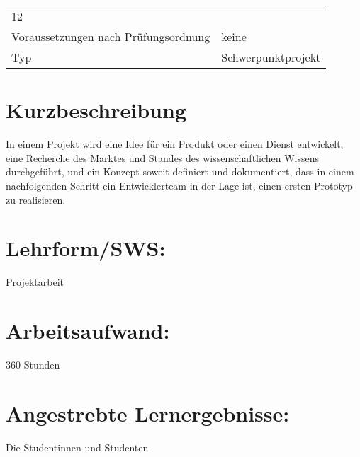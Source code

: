 \begin{longtable}[]{@{}ll@{}}
\begin{minipage}[t]{0.12\columnwidth}
12\strut
\end{minipage}\tabularnewline
\begin{minipage}[t]{0.12\columnwidth}\raggedright\strut
Voraussetzungen nach Prüfungsordnung\strut
\end{minipage} & \begin{minipage}[t]{0.12\columnwidth}\raggedright\strut
keine\strut
\end{minipage}\tabularnewline
\begin{minipage}[t]{0.12\columnwidth}\raggedright\strut
Typ\strut
\end{minipage} & \begin{minipage}[t]{0.12\columnwidth}\raggedright\strut
Schwerpunktprojekt\strut
\end{minipage}\tabularnewline
\bottomrule
\end{longtable}

\section*{Kurzbeschreibung}\label{kurzbeschreibung-4}

In einem Projekt wird eine Idee für ein Produkt oder einen Dienst
entwickelt, eine Recherche des Marktes und Standes des
wissenschaftlichen Wissens durchgeführt, und ein Konzept soweit
definiert und dokumentiert, dass in einem nachfolgenden Schritt ein
Entwicklerteam in der Lage ist, einen ersten Prototyp zu realisieren.

\section*{Lehrform/SWS:}\label{lehrformsws-10}

Projektarbeit

\section*{Arbeitsaufwand:}\label{arbeitsaufwand-16}

360 Stunden

\section*{Angestrebte
Lernergebnisse:}\label{angestrebte-lernergebnisse-10}

Die Studentinnen und Studenten

